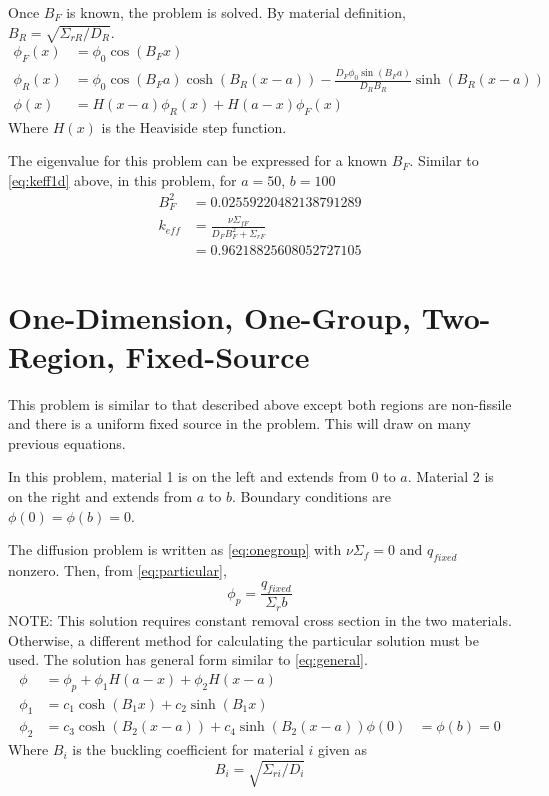 \documentclass{article}
\begin{document}
  Once $B_F$ is known, the problem is solved. By material definition, 
  ${B_R = \sqrt{\Sigma_{rR}/D_R}}$.
  \begin{align}
    \phi_F(x) &= \phi_0 \cos(B_F x)\\
    \phi_R(x) &= \phi_0 \cos(B_F a) \cosh(B_R (x-a)) 
      - \frac{D_F \phi_0 \sin(B_F a)}{D_R B_R} \sinh(B_R (x-a))\\
    \phi(x) &= H(x-a)\phi_R(x) + H(a-x)\phi_F(x)
  \end{align}
  Where $H(x)$ is the Heaviside step function.  
  
  The eigenvalue for this problem can be expressed for a known $B_F$. Similar 
  to \eqref{eq:keff1d} above, in this problem, for $a=50$, $b=100$
  \begin{align}
    B_F^2  &= 0.02559220482138791289 \\
    k_{eff} &= \frac{\nu\Sigma_{fF}}{D_F B_F^2 + \Sigma_{rF}} \\
    &= 0.96218825608052727105
  \end{align}
  
\section{One-Dimension, One-Group, Two-Region, Fixed-Source}
  This problem is similar to that described above except both regions are 
  non-fissile and there is a uniform fixed source in the problem. This will 
  draw on many previous equations.
  
  In this problem, material 1 is on the left and extends from 0 to $a$. 
  Material 2 is on the right and extends from $a$ to $b$. Boundary conditions 
  are $\phi(0)=\phi(b)=0$.
  
  The diffusion problem is written as \eqref{eq:onegroup} with 
  $\nu \Sigma_f =0$ and $q_{fixed}$ nonzero. Then, from \eqref{eq:particular},
  \begin{equation}
  	\phi_p = \frac{q_{fixed}}{\Sigma_r b}
  \end{equation}
  NOTE: This solution requires constant removal cross section in the two 
  materials. Otherwise, a different method for calculating the particular 
  solution must be used. The solution has general form similar to
  \eqref{eq:general}.
  \begin{align}
  	\phi &= \phi_p + \phi_1 H(a-x) + \phi_2 H(x-a) \\
    \phi_1 &= c_1 \cosh(B_1 x) + c_2 \sinh(B_1 x) \\
    \phi_2 &= c_3 \cosh(B_2 (x-a)) + c_4 \sinh(B_2 (x-a))
    \phi(0)&=\phi(b)=0
  \end{align}
  Where $B_i$ is the buckling coefficient for material $i$ given as
  \begin{equation}
    B_i = \sqrt{\Sigma_{ri} / D_i}
  \end{equation}
  
\end{document}
